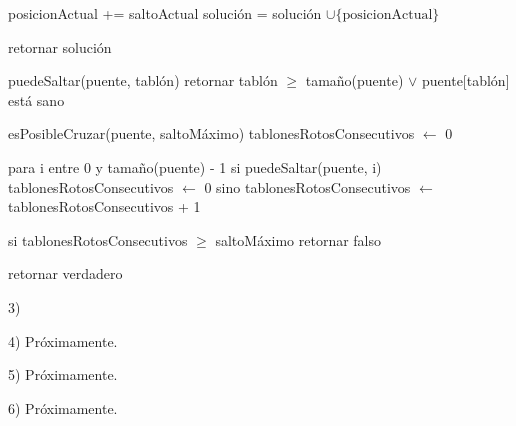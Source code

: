 \documentclass[a4paper]{article}
\begin{document}
    posicionActual += saltoActual
    solución = solución $\cup \{\text{posicionActual}\}$

  retornar solución

puedeSaltar(puente, tablón)
  retornar tablón $\geq$ tamaño(puente) $\lor$ puente[tablón] está sano

esPosibleCruzar(puente, saltoMáximo)
  tablonesRotosConsecutivos $\gets$ 0

  para i entre 0 y tamaño(puente) - 1
    si puedeSaltar(puente, i)
      tablonesRotosConsecutivos $\gets$ 0
    sino
      tablonesRotosConsecutivos $\gets$ tablonesRotosConsecutivos + 1

    si tablonesRotosConsecutivos $\geq$ saltoMáximo
      retornar falso

  retornar verdadero

3)

4) Próximamente.

5) Próximamente.

6) Próximamente.
\end{document}
